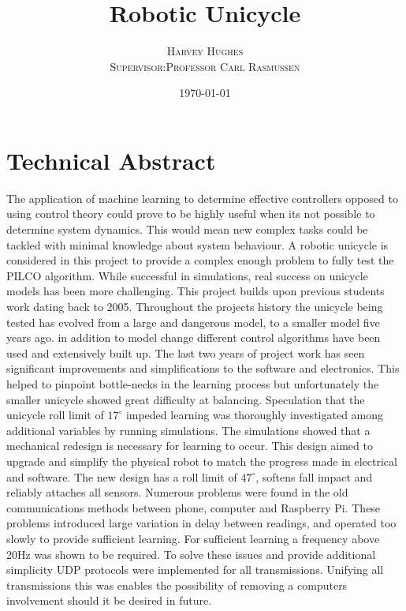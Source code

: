 \documentclass[twoside,twocolumn,12pt]{article}
\title{Robotic Unicycle} %
\author{%
\textsc{Harvey Hughes} \\
\textsc{Supervisor:Professor Carl Rasmussen} \\
}
\date{\today} %
\begin{document}
\onecolumn
\maketitle


\section*{Technical Abstract}
The application of machine learning to determine effective controllers opposed to using control theory could prove to be highly useful when its not possible to determine system dynamics. This would mean new complex tasks could be tackled with minimal knowledge about system behaviour.  A robotic unicycle is considered in this project to provide a complex enough problem to fully test the PILCO algorithm. While successful in simulations, real success on unicycle models has been more challenging. 
\newline
\newline
This project builds upon previous students work dating back to 2005. Throughout the projects history the unicycle being tested has evolved from a large and dangerous model, to a smaller model five years ago. in addition to model change different control algorithms have been used and extensively built up. 
\newline
\newline
The last two years of project work has seen significant improvements and simplifications to the software and electronics. This helped to pinpoint bottle-necks in the learning process but unfortunately the smaller unicycle showed great difficulty at balancing.
\newline
\newline
Speculation that the unicycle roll limit of $17^{\circ}$ impeded learning was thoroughly investigated among additional variables by running simulations. The simulations showed that a mechanical redesign is necessary for learning to occur. This design aimed to upgrade and simplify the physical robot to match the progress made in electrical and software. The new design has a roll limit of $47^{\circ}$, softens fall impact and reliably attaches all sensors. 
\newline
\newline
Numerous problems were found in the old communications methods between phone, computer and Raspberry Pi. These problems introduced large variation in delay between readings, and operated too slowly to provide sufficient learning. For sufficient learning a frequency above 20Hz was shown to be required. To solve these issues and provide additional simplicity UDP protocols were implemented for all transmissions. Unifying all transmissions this was enables the possibility of removing a computers involvement should it be desired in future.
\end{document}
